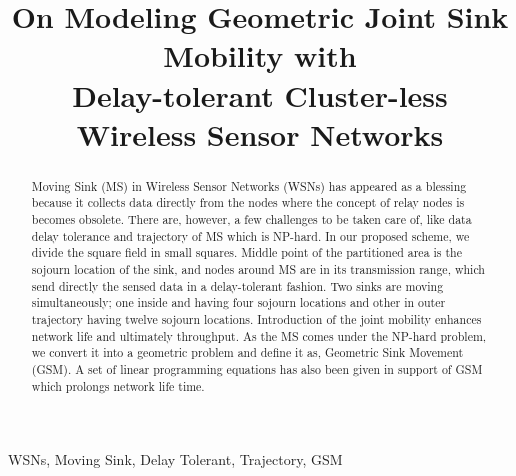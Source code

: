 \documentclass[conference]{IEEEtran}
\begin{document}
\title{On Modeling Geometric Joint Sink Mobility with\\ Delay-tolerant Cluster-less Wireless Sensor Networks}


\address{$^{\pounds}$COMSATS Institute of Information Technology, Islamabad, Pakistan. \\
        $^{\$}$Faculty of Engineering, Dalhousie University, Halifax, Canada.\\
        $^{\S}$University of Alberta, Alberta, Canada.}
\maketitle

\begin{abstract}
Moving Sink (MS) in Wireless Sensor Networks (WSNs) has appeared as a blessing because it collects data directly from the nodes where the concept of relay nodes is becomes obsolete. There are, however, a few challenges to be taken care of, like data delay tolerance and trajectory of MS which is NP-hard. In our proposed scheme, we divide the square field in small squares. Middle point of the partitioned area is the sojourn location of the sink, and nodes around MS are in its transmission range, which send directly the sensed data in a delay-tolerant fashion.  Two sinks are moving simultaneously; one inside and having four sojourn locations and other in outer trajectory having twelve sojourn locations. Introduction of the joint mobility enhances network life and ultimately throughput. As the MS comes under the NP-hard problem, we convert it into a geometric problem and define it as, Geometric Sink Movement (GSM). A set of linear programming equations has also been given in support of GSM which prolongs network life time.
 \end{abstract}
\IEEEpeerreviewmaketitle
\begin{IEEEkeywords}
WSNs, Moving Sink, Delay Tolerant, Trajectory, GSM
\end{IEEEkeywords}
\end{document}
